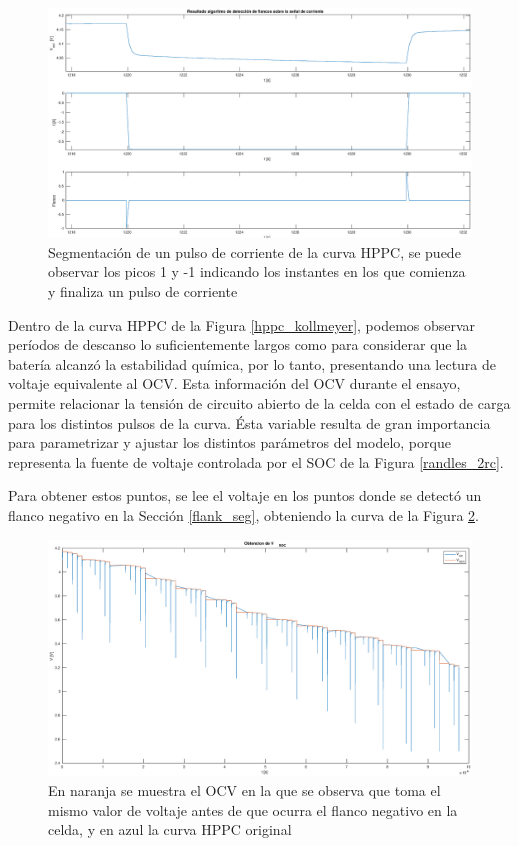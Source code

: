 \documentclass[10pt,a4paper]{article}
\newcounter{subsubsubsection}[subsubsection]
\begin{document}
\begin{figure}[h!]
    \begin{center}
        \includegraphics[width=.8\textwidth]{flank_seg_hppc.eps}
        \caption{Segmentaci\'on de un pulso de corriente de la curva
        \acrshort{HPPC}, se puede observar los picos 1 y -1 indicando los
        instantes en los que comienza y finaliza un pulso de corriente}
        \label{flank_seg_hppc}
    \end{center}
\end{figure}


Dentro de la curva \acrshort{HPPC} de la Figura \ref{hppc_kollmeyer}, podemos
observar per\'iodos de descanso lo suficientemente largos como para considerar
que la bater\'ia alcanz\'o la estabilidad qu\'imica, por lo tanto, presentando
una lectura de voltaje equivalente al \acrshort{OCV}. Esta informaci\'on del 
\acrshort{OCV} durante el ensayo, permite relacionar la tensi\'on de circuito 
abierto de la celda con el estado de carga para los distintos pulsos de la 
curva. \'Esta variable resulta de gran importancia para parametrizar y ajustar
los distintos par\'ametros del modelo, porque representa la fuente de voltaje
controlada por el \acrshort{SOC} de la Figura \ref{randles_2rc}.

Para obtener estos puntos, se lee el voltaje en los puntos donde se detect\'o un
flanco negativo en la Secci\'on \ref{flank_seg}, obteniendo la curva de la
Figura \ref{ocv_detection}.

\begin{figure}[h!]
    \begin{center}
        \includegraphics[width=.7\textwidth]{soc_detection}
        \caption{En naranja se muestra el \acrshort{OCV} en la que se observa
        que toma el mismo valor de voltaje antes de que ocurra el flanco
        negativo en la celda, y en azul la curva \acrshort{HPPC} original}
        \label{ocv_detection}
    \end{center}
\end{figure}
\end{document}
